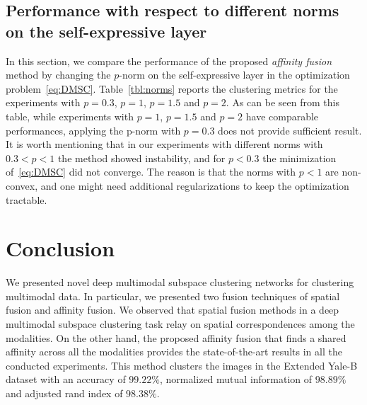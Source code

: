 \documentclass[journal]{IEEEtran}
\begin{document}
\subsection{Performance with respect to different norms on the self-expressive layer}
In this section, we compare the performance of the proposed \emph{affinity fusion} method by changing the  $p$-norm on the self-expressive layer in the optimization problem~\eqref{eq:DMSC}.   Table~\ref{tbl:norms} reports the clustering metrics for the experiments with $p=0.3$, $p=1$, $p=1.5$ and $p=2$.   As can be seen from this table, while experiments with $p=1$, $p=1.5$ and $p=2$ have comparable performances, applying the p-norm with $p=0.3$ does not provide sufficient result.  It is worth mentioning that in our experiments with different norms with $0.3<p<1$ the method showed instability, and for $p<0.3$ the minimization of~\eqref{eq:DMSC} did not converge.  The reason is that the norms with $p<1$ are non-convex, and one might need additional regularizations to keep the optimization tractable. 

\begin{table}[t]
\begin{center}
\caption{Analysis of different regularization norms on the self-expressive layer.  Our experiments with $p<0$ did not converged. The results are 5-fold average. We use boldface for the top performer.} \label{tbl:norms}
\end{center}
\end{table}


\section{Conclusion}\label{sec:con}
We presented novel deep multimodal subspace clustering networks for clustering multimodal data.  In particular, we presented two fusion techniques of spatial fusion and affinity fusion.   We observed that spatial fusion methods in a deep multimodal subspace clustering task relay on spatial correspondences among the modalities.  On the other hand, the proposed affinity fusion that finds a shared affinity across all the modalities provides the state-of-the-art results in all the conducted experiments.  This method clusters the images in the Extended Yale-B dataset with an accuracy  of $99.22\%$, normalized mutual information of $98.89\%$ and adjusted rand index of $98.38\%$.  
\end{document}
